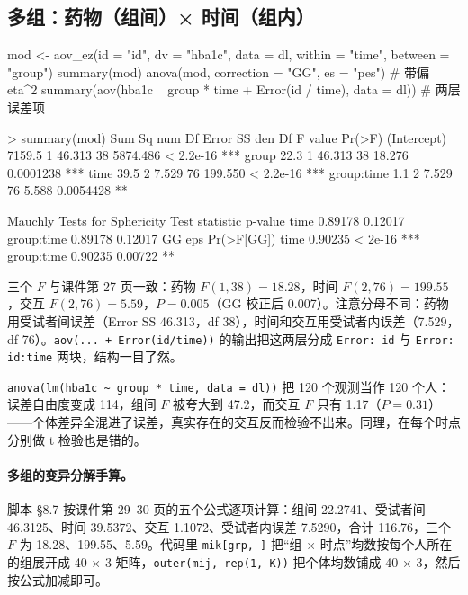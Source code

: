 \subsection{多组：药物（组间）× 时间（组内）}
\begin{RCode}[R · aov\_ez 多组]
mod <- aov_ez(id = "id", dv = "hba1c", data = dl, within = "time", between = "group")
summary(mod)
anova(mod, correction = "GG", es = "pes")                       # 带偏 eta^2
summary(aov(hba1c ~ group * time + Error(id / time), data = dl))  # 两层误差项
\end{RCode}
\begin{ROut}
> summary(mod)
            Sum Sq num Df Error SS den Df  F value    Pr(>F)
(Intercept) 7159.5      1   46.313     38 5874.486 < 2.2e-16 ***
group         22.3      1   46.313     38   18.276 0.0001238 ***
time          39.5      2    7.529     76  199.550 < 2.2e-16 ***
group:time     1.1      2    7.529     76    5.588 0.0054428 **

Mauchly Tests for Sphericity
           Test statistic p-value
time              0.89178 0.12017
group:time        0.89178 0.12017
            GG eps Pr(>F[GG])
time       0.90235    < 2e-16 ***
group:time 0.90235    0.00722 **
\end{ROut}
三个 $F$ 与课件第 27 页一致：药物 $F(1,38)=18.28$，时间 $F(2,76)=199.55$，交互 $F(2,76)=5.59$，$P=0.005$（GG 校正后 0.007）。注意分母不同：药物用受试者间误差（Error SS 46.313，df 38），时间和交互用受试者内误差（7.529，df 76）。\Verb|aov(... + Error(id/time))| 的输出把这两层分成 \Verb|Error: id| 与 \Verb|Error: id:time| 两块，结构一目了然。

\begin{notebox}
\Verb|anova(lm(hba1c ~ group * time, data = dl))| 把 120 个观测当作 120 个人：误差自由度变成 114，组间 $F$ 被夸大到 47.2，而交互 $F$ 只有 1.17（$P=0.31$）——个体差异全混进了误差，真实存在的交互反而检验不出来。同理，在每个时点分别做 t 检验也是错的。
\end{notebox}

\paragraph{多组的变异分解手算。}脚本 §8.7 按课件第 29–30 页的五个公式逐项计算：组间 22.2741、受试者间 46.3125、时间 39.5372、交互 1.1072、受试者内误差 7.5290，合计 116.76，三个 $F$ 为 18.28、199.55、5.59。代码里 \Verb|mik[grp, ]| 把“组 × 时点”均数按每个人所在的组展开成 40 × 3 矩阵，\Verb|outer(mij, rep(1, K))| 把个体均数铺成 40 × 3，然后按公式加减即可。

